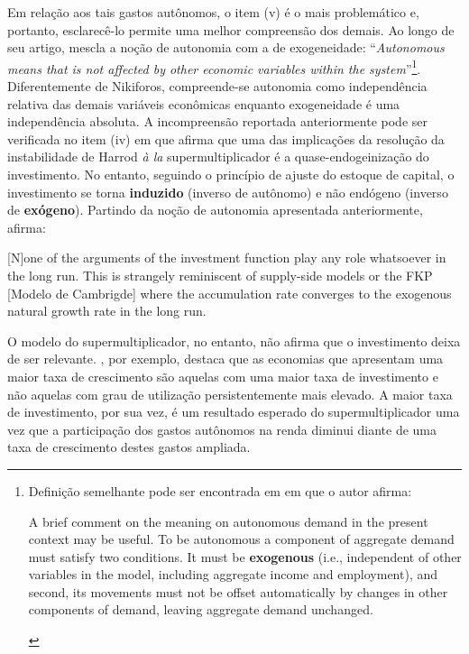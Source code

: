 Em relação aos tais gastos autônomos, o item (v) é o mais problemático e, portanto, esclarecê-lo permite uma melhor compreensão dos demais. Ao longo de seu artigo, \textcite[p.~4]{nikiforos_comments_2018} mescla a noção de autonomia com a de exogeneidade: ``\textit{Autonomous means that is not affected by other economic variables within the system}''\footnote{
	Definição semelhante pode ser encontrada em \textcite[p.~2, grifos adicionados]{skott_autonomous_2017} em que o autor afirma:
	\begin{citacao}
		A brief comment on the meaning on autonomous demand in the present context may be useful. To
		be autonomous a component of aggregate demand must satisfy two conditions. It must be \textbf{exogenous}
		(i.e., independent of other variables in the model, including aggregate income and employment), and
		second, its movements must not be offset automatically by changes in other components of demand,
		leaving aggregate demand unchanged.
	\end{citacao}	
}. Diferentemente de Nikiforos, compreende-se autonomia como independência relativa das demais variáveis econômicas enquanto exogeneidade é uma independência absoluta. 
A incompreensão reportada anteriormente pode ser verificada no item (iv) em que afirma que uma das implicações da resolução da instabilidade de Harrod \textit{à la} supermultiplicador é a quase-endogeinização do investimento. No entanto, seguindo o princípio de ajuste do estoque de capital, o investimento se torna \textbf{induzido} (inverso de autônomo) e não endógeno (inverso de \textbf{exógeno}). Partindo da noção de autonomia apresentada anteriormente, \citeauthor*{nikiforos_comments_2018} afirma:
\begin{citacao}
	
	[N]one of the arguments of the investment function play any role whatsoever in the long run. This is strangely
	reminiscent of supply-side models or the FKP [Modelo de Cambrigde] where the accumulation rate converges to the
	exogenous natural growth rate in the long run. \cite[p.~11--12, comentario adicionado]{nikiforos_comments_2018}
\end{citacao}
O modelo do supermultiplicador, no entanto, não afirma que o investimento deixa de ser relevante. \textcite{dejuan_hidden_2017}, por exemplo, destaca que as economias que apresentam uma maior taxa de crescimento são aquelas com uma maior taxa de investimento e não aquelas com grau de utilização persistentemente mais elevado. A maior taxa de investimento, por sua vez, é um resultado esperado do supermultiplicador uma vez que a participação dos gastos autônomos na renda diminui diante de uma taxa de crescimento destes gastos ampliada.

